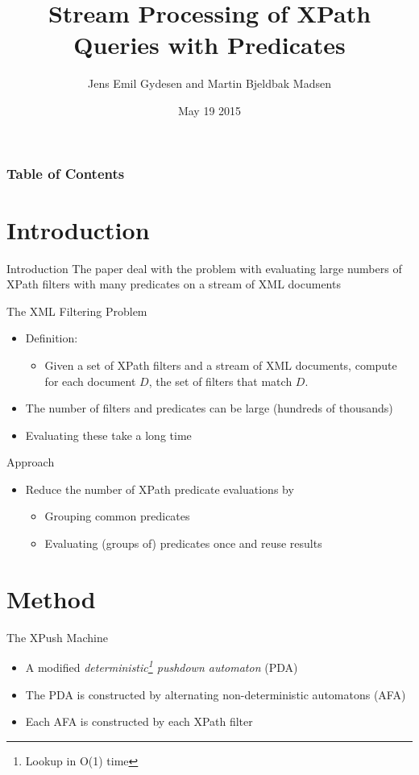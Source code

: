 \documentclass[mathserif,serif]{beamer}
\title{\large Stream Processing of XPath Queries with Predicates}
\author{Jens Emil Gydesen and Martin Bjeldbak Madsen}
\date{May 19 2015}
\begin{document}
\frame{\titlepage}

\begin{frame}
  \frametitle{Table of Contents}
  \tableofcontents[hideallsubsections]
\end{frame}


\section{Introduction}
\begin{frame}{Introduction}
  The paper deal with the problem with evaluating large numbers of XPath filters with many predicates on a stream of XML documents
\end{frame}
\begin{frame}{The XML Filtering Problem}
  \begin{itemize}
    \item Definition:
    \begin{itemize}
      \item Given a set of XPath filters and a stream of XML documents, compute for each document $D$, the set of filters that match $D$.
    \end{itemize}
    \item The number of filters and predicates can be large (hundreds of thousands)
    \item Evaluating these take a long time
  \end{itemize}
\end{frame}

\begin{frame}{Approach}
  \begin{itemize}
    \item Reduce the number of XPath predicate evaluations by
    \begin{itemize}
      \item Grouping common predicates 
      \item Evaluating (groups of) predicates once and reuse results
    \end{itemize}
  \end{itemize}
\end{frame}

\section{Method}
\begin{frame}{The XPush Machine}
  \begin{itemize}
    \item A modified \emph{deterministic\footnote{Lookup in O(1) time} pushdown automaton} (PDA)
    \item The PDA is constructed by alternating non-deterministic automatons (AFA)
    \item Each AFA is constructed by each XPath filter
  \end{itemize}
\end{frame}
\end{document}
